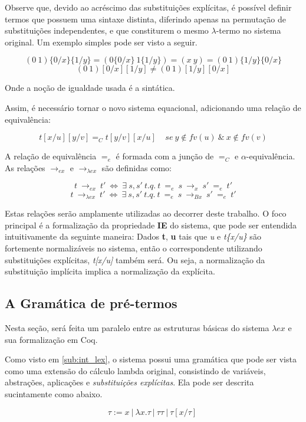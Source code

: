 Observe que, devido ao acréscimo das substituições explícitas, é possível
definir termos que possuem uma sintaxe distinta, diferindo apenas na permutação
de substituições independentes, e que constiturem o mesmo
$\lambda$-termo no sistema original. Um exemplo simples pode ser visto a seguir.

\[ (0\ 1) \{0/x\}\{1/y\} = (0\{0/x\}\ 1\{1/y\}) = (x\ y) =  (0\ 1) \{1/y\}\{0/x\} \]
\[ (0\ 1) [0/x][1/y] \neq  (0\ 1) [1/y][0/x] \]

Onde a noção de igualdade usada é a sintática.

Assim, é necessário tornar o novo sistema
equacional, adicionando uma relação de equivalência:

\[ t[x/u][y/v] =_C t[y/v][x/u] \ \ \ \ \ se\ y \notin fv(u)\ \&\ x \notin fv(v)\] 

A relação de equivalência $=_e$ é formada com a junção de $=_C$ e
$\alpha$-equivalência. As relações $\rightarrow_{ex}$ e $\rightarrow_{\lambda
    ex}$ são definidas como:

\[t\ \rightarrow_{ex}\ t'\ \iff\ \exists\ s,s'\ t.q.\ t\ =_{e}\ s\
    \rightarrow_x\ s'\ =_e\ t' \]
\[t\ \rightarrow_{\lambda ex}\ t'\ \iff\ \exists\ s,s'\ t.q.\ t\ =_{e}\ s\
    \rightarrow_{Bx}\ s'\ =_e\ t' \]

Estas relações serão amplamente utilizadas ao decorrer deste trabalho. 
O foco principal é a formalização da propriedade \textbf{IE} do sistema, que
pode ser entendida intuitivamente da seguinte maneira: Dados \textbf{t},
\textbf{u} tais que \emph{u} e \emph{t\{x/u\}} são fortemente normalizáveis
no sistema, então o correspondente utilizando substituições explícitas,
\emph{t[x/u]} também será. Ou seja, a normalização da substituição implícita
implica a normalização da explícita.

\subsection{A Gramática de pré-termos}
\label{sec:termos}

Nesta seção, será feita um paralelo entre as estruturas básicas do sistema
$\lambda ex$ e sua formalização em Coq.

Como visto em \ref{sub:int_lex}, o sistema possui uma gramática que pode ser vista como
uma extensão do cálculo lambda original, consistindo de variáveis, abstrações,
aplicações e \emph{substituições explícitas}. Ela pode ser descrita sucintamente
como abaixo.

\[ \tau := x\ |\ \lambda x.\tau\ |\ \tau \tau\ |\ \tau[x/\tau]\ \]

